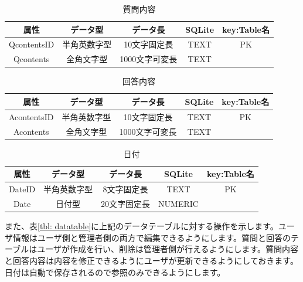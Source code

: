 \documentclass[a4j]{jarticle}
\begin{document}
\begin{table}[H]
    \caption{質問内容}
    \label{tbl: qcontents}
    \begin{center}
        \begin{tabular}{|c|c|c|c|c|} \hline
           属性 & データ型 & データ長 & SQLite & key:Table名\\ \hline \hline
            QcontentsID & 半角英数字型 & 10文字固定長 & TEXT & PK\\ \hline
            Qcontents & 全角文字型 & 1000文字可変長 & TEXT & \\ \hline
        \end{tabular}
    \end{center}
\end{table}


\begin{table}[H]
    \caption{回答内容}
    \label{tbl: acontents}
    \begin{center}
        \begin{tabular}{|c|c|c|c|c|} \hline
            属性 & データ型 & データ長 & SQLite & key:Table名\\ \hline \hline
            AcontentsID & 半角英数字型 & 10文字固定長 & TEXT & PK\\ \hline
            Acontents & 全角文字型 & 1000文字可変長 & TEXT & \\ \hline
        \end{tabular}
    \end{center}
\end{table}

\begin{table}[H]
    \caption{日付}
    \label{tbl: date}
    \begin{center}
        \begin{tabular}{|c|c|c|c|c|} \hline
            属性 & データ型 & データ長 & SQLite & key:Table名\\ \hline \hline
            DateID & 半角英数字型 & 8文字固定長 & TEXT & PK\\ \hline
            Date & 日付型 & 20文字固定長 & NUMERIC & \\ \hline
        \end{tabular}
    \end{center}
\end{table}


また、表\ref{tbl: datatable}に上記のデータテーブルに対する操作を示します。ユーザ情報はユーザ側と管理者側の両方で編集できるようにします。質問と回答のテーブルはユーザが作成を行い、削除は管理者側が行えるようにします。質問内容と回答内容は内容を修正できるようにユーザが更新できるようにしておきます。日付は自動で保存されるので参照のみできるようにします。
\end{document}
